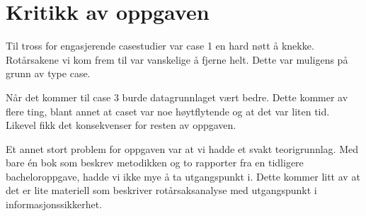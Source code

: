 \section{Kritikk av oppgaven}
Til tross for engasjerende casestudier var case 1 en hard nøtt å knekke. Rotårsakene vi kom frem til var vanskelige å fjerne helt. Dette var muligens på grunn av type case. 

Når det kommer til case 3 burde datagrunnlaget vært bedre. Dette kommer av flere ting, blant annet at caset var noe høytflytende og at det var liten tid. Likevel fikk det konsekvenser for resten av oppgaven. 

Et annet stort problem for oppgaven var at vi hadde et svakt teorigrunnlag. Med bare én bok som beskrev metodikken og to rapporter fra en tidligere bacheloroppgave, hadde vi ikke mye å ta utgangspunkt i. Dette kommer litt av at det er lite materiell som beskriver rotårsaksanalyse med utgangspunkt i informasjonssikkerhet. 
